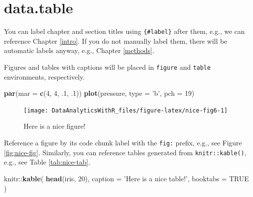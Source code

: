 \documentclass[]{book}
\newenvironment{Shaded}{\begin{snugshade}}{\end{snugshade}}
\newcommand{\KeywordTok}[1]{\textcolor[rgb]{0.13,0.29,0.53}{\textbf{{#1}}}}
\newcommand{\DataTypeTok}[1]{\textcolor[rgb]{0.13,0.29,0.53}{{#1}}}
\newcommand{\DecValTok}[1]{\textcolor[rgb]{0.00,0.00,0.81}{{#1}}}
\newcommand{\StringTok}[1]{\textcolor[rgb]{0.31,0.60,0.02}{{#1}}}
\newcommand{\OtherTok}[1]{\textcolor[rgb]{0.56,0.35,0.01}{{#1}}}
\newcommand{\NormalTok}[1]{{#1}}
\theoremstyle{definition}
\theoremstyle{definition}
\theoremstyle{remark}
\begin{document}
\section{data.table}\label{data.table}

You can label chapter and section titles using \texttt{\{\#label\}}
after them, e.g., we can reference Chapter \ref{intro}. If you do not
manually label them, there will be automatic labels anyway, e.g.,
Chapter \ref{methods}.

Figures and tables with captions will be placed in \texttt{figure} and
\texttt{table} environments, respectively.

\begin{Shaded}
\begin{Highlighting}[]
\KeywordTok{par}\NormalTok{(}\DataTypeTok{mar =} \KeywordTok{c}\NormalTok{(}\DecValTok{4}\NormalTok{, }\DecValTok{4}\NormalTok{, .}\DecValTok{1}\NormalTok{, .}\DecValTok{1}\NormalTok{))}
\KeywordTok{plot}\NormalTok{(pressure, }\DataTypeTok{type =} \StringTok{'b'}\NormalTok{, }\DataTypeTok{pch =} \DecValTok{19}\NormalTok{)}
\end{Highlighting}
\end{Shaded}

\begin{figure}

{\centering \texttt{[image: DataAnalyticsWithR\_files/figure-latex/nice-fig6-1]} 

}

\caption{Here is a nice figure!}\label{fig:nice-fig6}
\end{figure}

Reference a figure by its code chunk label with the \texttt{fig:}
prefix, e.g., see Figure \ref{fig:nice-fig}. Similarly, you can
reference tables generated from \texttt{knitr::kable()}, e.g., see Table
\ref{tab:nice-tab}.

\begin{Shaded}
\begin{Highlighting}[]
\NormalTok{knitr::}\KeywordTok{kable}\NormalTok{(}
  \KeywordTok{head}\NormalTok{(iris, }\DecValTok{20}\NormalTok{), }\DataTypeTok{caption =} \StringTok{'Here is a nice table!'}\NormalTok{,}
  \DataTypeTok{booktabs =} \OtherTok{TRUE}
\NormalTok{)}
\end{Highlighting}
\end{Shaded}
\end{document}
